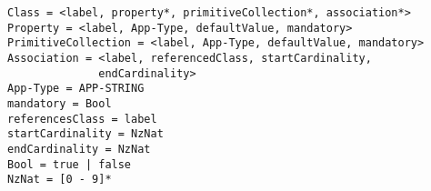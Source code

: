 \documentclass[11pt]{article}
\begin{document}
\begin{verbatim}
Class = <label, property*, primitiveCollection*, association*>
Property = <label, App-Type, defaultValue, mandatory>
PrimitiveCollection = <label, App-Type, defaultValue, mandatory>
Association = <label, referencedClass, startCardinality, 
              endCardinality>
App-Type = APP-STRING 
mandatory = Bool
referencesClass = label
startCardinality = NzNat
endCardinality = NzNat
Bool = true | false
NzNat = [0 - 9]*
\end{verbatim}
\end{document}

